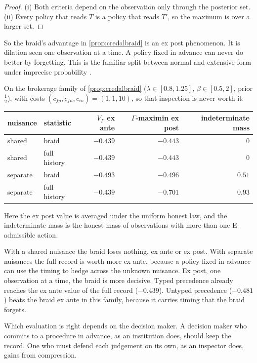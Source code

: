 \documentclass[11pt]{article}
\theoremstyle{definition}\newtheorem{definition}[theorem]{Definition}\newtheorem{remark}[theorem]{Remark}\newtheorem{example}[theorem]{Example}\newtheorem{problem}[theorem]{Open problem}\crefname{problem}{Problem}{Problems}
\begin{document}
\begin{proof}
(i) Both criteria depend on the observation only through the posterior set. (ii) Every policy that reads $T$ is a policy that reads $T'$, so the maximum is over a larger set.
\end{proof}

So the braid's advantage in \cref{prop:credalbraid} is an ex post phenomenon. It is dilation seen one observation at a time. A policy fixed in advance can never do better by forgetting. This is the familiar split between normal and extensive form under imprecise probability \cite{SeidenfeldWasserman1993}.

On the brokerage family of \cref{prop:credalbraid} ($\lambda\in[0.8,1.25]$, $\beta\in[0.5,2]$, prior $\tfrac12$), with costs $(c_{fp},c_{fn},c_{in})=(1,1,10)$, so that inspection is never worth it:

\begin{center}
\begin{tabular}{llrrr}
nuisance & statistic & $V_\Gamma$ ex ante & $\Gamma$-maximin ex post & indeterminate mass \\ \hline
shared & braid & $-0.439$ & $-0.443$ & $0$ \\
shared & full history & $-0.439$ & $-0.443$ & $0$ \\
separate & braid & $-0.493$ & $-0.496$ & $0.51$ \\
separate & full history & $-0.439$ & $-0.701$ & $0.93$ \\
\end{tabular}
\end{center}

Here the ex post value is averaged under the uniform honest law, and the indeterminate mass is the honest mass of observations with more than one E-admissible action.

With a shared nuisance the braid loses nothing, ex ante or ex post. With separate nuisances the full record is worth more ex ante, because a policy fixed in advance can use the timing to hedge across the unknown nuisance. Ex post, one observation at a time, the braid is more decisive. Typed precedence already reaches the ex ante value of the full record ($-0.439$). Untyped precedence ($-0.481$) beats the braid ex ante in this family, because it carries timing that the braid forgets.

Which evaluation is right depends on the decision maker. A decision maker who commits to a procedure in advance, as an institution does, should keep the record. One who must defend each judgement on its own, as an inspector does, gains from compression.
\end{document}
